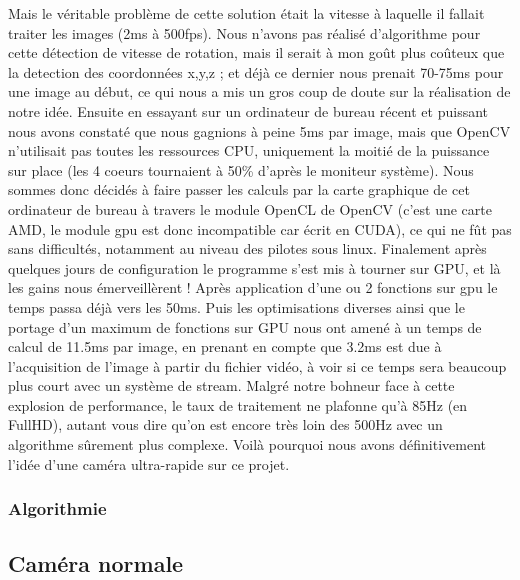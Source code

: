Mais le véritable problème de cette solution était la vitesse à laquelle il fallait traiter les images (2ms à 500fps). Nous n'avons pas réalisé d'algorithme pour cette détection de vitesse de rotation, mais il serait à mon goût plus coûteux que la detection des coordonnées x,y,z ; et déjà ce dernier nous prenait 70-75ms pour une image au début, ce qui nous a mis un gros coup de doute sur la réalisation de notre idée. Ensuite en essayant sur un ordinateur de bureau récent et puissant nous avons constaté que nous gagnions à peine 5ms par image, mais que OpenCV n'utilisait pas toutes les ressources CPU, uniquement la moitié de la puissance sur place (les 4 coeurs tournaient à 50\% d'après le moniteur système). Nous sommes donc décidés à faire passer les calculs par la carte graphique de cet ordinateur de bureau à travers le module OpenCL de OpenCV (c'est une carte AMD, le module gpu est donc incompatible car écrit en CUDA), ce qui ne fût pas sans difficultés, notamment au niveau des pilotes sous linux. Finalement après quelques jours de configuration le programme s'est mis à tourner sur GPU, et là les gains nous émerveillèrent ! Après application d'une ou 2 fonctions sur gpu le temps passa déjà vers les 50ms. Puis les optimisations diverses ainsi que le portage d'un maximum de fonctions sur GPU nous ont amené à un temps de calcul de 11.5ms par image, en prenant en compte que 3.2ms est due à l'acquisition de l'image à partir du fichier vidéo, à voir si ce temps sera beaucoup plus court avec un système de stream. Malgré notre bohneur face à cette explosion de performance, le taux de traitement ne plafonne qu'à 85Hz (en FullHD), autant vous dire qu'on est encore très loin des 500Hz avec un algorithme sûrement plus complexe. Voilà pourquoi nous avons définitivement l'idée d'une caméra ultra-rapide sur ce projet.

\subsubsection{Algorithmie}


\subsection{Caméra normale}

